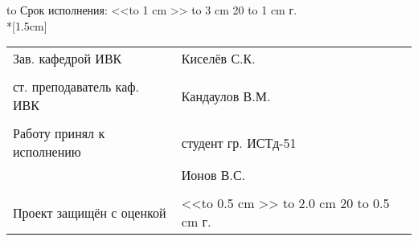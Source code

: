 \begin{titlepage}
\begin{flushleft}
\hbox to \textwidth {}
Срок исполнения: <<{\hbox to 1 cm {\hrulefill}}>>\hspace{0.3cm} {\hbox to 3 cm {\hrulefill}} \hspace{0.2cm} {20 \hbox to 1 cm {\hrulefill} г.}  \\*[1.5cm]
\begin{tabular}{p{}p{}}
  Зав. кафедрой ИВК          &
  Киселёв С.К.               \\
  \\
  ст. преподаватель каф. ИВК &
  Кандаулов В.М.             \\
  \\
  Работу принял к исполнению &
  студент гр. ИСТд-51        \\
                             &
  Ионов В.С.                 \\
  \\
  Проект защищён с оценкой   &
  <<{\hbox to 0.5 cm {\hrulefill}}>>\hspace{0.3cm} {\hbox to 2.0 cm {\hrulefill}} \hspace{0.2cm} {20 \hbox to 0.5 cm {\hrulefill} г.} \\
\end{tabular}
\end{flushleft}
\thispagestyle{empty}
\end{titlepage}
\newpage
